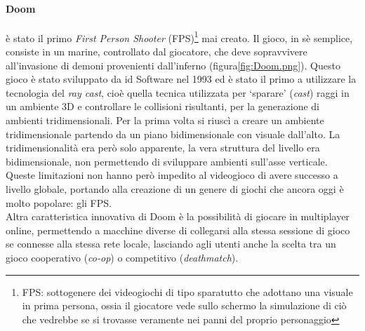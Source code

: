         \paragraph{Doom} è stato il primo \textit{First Person Shooter} (FPS)\footnote{FPS: sottogenere dei videogiochi di tipo sparatutto che adottano una visuale in prima persona, ossia il giocatore vede 
            sullo schermo la simulazione di ciò che vedrebbe se si trovasse veramente nei panni del proprio personaggio} mai creato. Il gioco, in sè semplice, consiste in un marine,
            controllato dal giocatore, che deve sopravvivere all'invasione di demoni provenienti dall'inferno (figura\ref{fig:Doom.png}). Questo gioco è stato sviluppato da id Software
            nel 1993 ed è stato il primo a utilizzare la tecnologia del \textit{ray cast}, cioè quella tecnica utilizzata per `sparare' (\textit{cast}) raggi in un ambiente 3D e controllare
            le collisioni risultanti, per la generazione di ambienti tridimensionali. Per la prima volta si riuscì a creare un ambiente tridimensionale partendo da un piano 
            bidimensionale con visuale dall'alto. La tridimensionalità era però solo apparente, la vera struttura del livello era bidimensionale, non permettendo di
            sviluppare ambienti sull'asse verticale. Queste limitazioni non hanno però impedito al videogioco di avere successo a livello globale, portando alla creazione di un 
            genere di giochi che ancora oggi è molto popolare: gli FPS.\\
            Altra caratteristica innovativa di Doom è la possibilità di giocare in multiplayer online, permettendo a macchine diverse di collegarsi alla stessa sessione di gioco
            se connesse alla stessa rete locale, lasciando agli utenti anche la scelta tra un gioco cooperativo (\textit{co-op}) o competitivo (\textit{deathmatch}).
        
